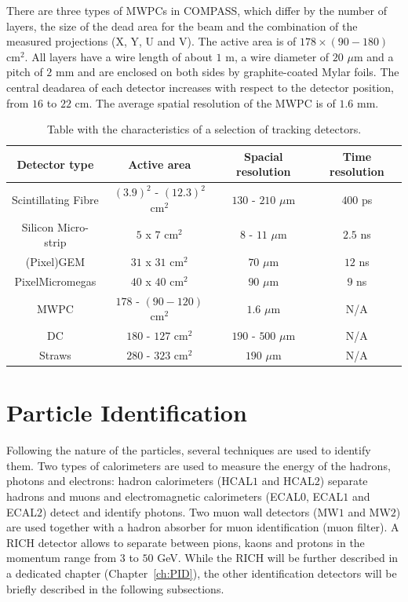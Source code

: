 There are three types of MWPCs in COMPASS, which differ by the number of layers, the size of the dead area for the beam and the combination of the measured projections (X, Y, U and V). The active area is of $178 \times (90-180)$ cm$^2$. All layers have a wire length of about $1$ m, a wire diameter of $20$ $\mu$m and a pitch of $2$ mm and are enclosed on both sides by graphite-coated Mylar foils. The central deadarea of each detector increases with respect to the detector position, from $16$ to $22$ cm. The average spatial resolution of the MWPC is of $1.6$ mm.

\begin{table}[!h]
  \caption{Table with the characteristics of a selection of tracking detectors.}
  \label{tab:kinvar}
  \centering
  \begin{tabular}{c|c|c|c}
    \hline
    \hline
    Detector type & Active area & Spacial resolution & Time resolution \\
    \hline
    \hline
    Scintillating Fibre & $(3.9)^2$ - $(12.3)^2$ cm$^2$ & $130$ - $210$ $\mu$m & $400$ ps \\
    Silicon Micro-strip & $5$ x $7$ cm$^2$ & $8$ - $11$ $\mu$m & $2.5$ ns \\
    (Pixel)GEM & $31$ x $31$ cm$^2$ & $70$ $\mu$m & $12$ ns \\
    PixelMicromegas & $40$ x $40$ cm$^2$ & $90$ $\mu$m & $9$ ns \\
    MWPC & $178$ - $(90-120)$ cm$^2$ & $1.6$ $\mu$m & N/A \\
    DC & $180$ - $127$ cm$^2$ & $190$ - $500$ $\mu$m & N/A \\
    Straws & $280$ - $323$ cm$^2$ & $190$ $\mu$m & N/A \\
    \hline
    \hline
  \end{tabular}
\end{table}


\section{Particle Identification}

Following the nature of the particles, several techniques are used to identify them. Two types of calorimeters are used to measure the energy of the hadrons, photons and electrons: hadron calorimeters (HCAL$1$ and HCAL$2$) separate hadrons and muons and electromagnetic calorimeters (ECAL$0$, ECAL$1$ and ECAL$2$) detect and identify photons. Two muon wall detectors (MW$1$ and MW$2$) are used together with a hadron absorber for muon identification (muon filter). A RICH detector allows to separate between pions, kaons and protons in the momentum range from $3$ to $50$ GeV. While the RICH will be further described in a dedicated chapter (Chapter~\ref{ch:PID}), the other identification detectors will be briefly described in the following subsections.

